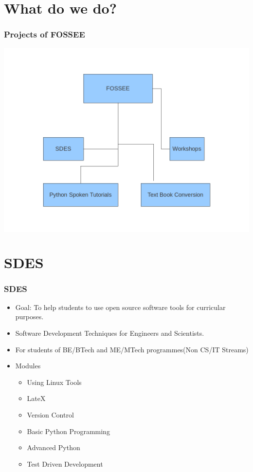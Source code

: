 \documentclass{beamer}
\begin{document}
\section{What do we do?}
\begin{frame}
  \frametitle{Projects of FOSSEE}
  \begin{center}
  	\includegraphics[scale=0.25]{pythonst.png}
  \end{center}
\end{frame}

\section{SDES}
\begin{frame}
  \frametitle{SDES}
    \begin{itemize}
    \item Goal: To help students to use open source software tools for curricular purposes. 
    \item Software Development Techniques for Engineers and Scientists.
    \item For students of BE/BTech and ME/MTech programmes(Non CS/IT Streams)
    \item Modules 
    \begin{itemize}
    \item Using Linux Tools
	\item LateX
	\item Version Control
	\item Basic Python Programming
	\item Advanced Python
	\item Test Driven Development
    \end{itemize}
	\end{itemize}
\end{frame}
\end{document}
